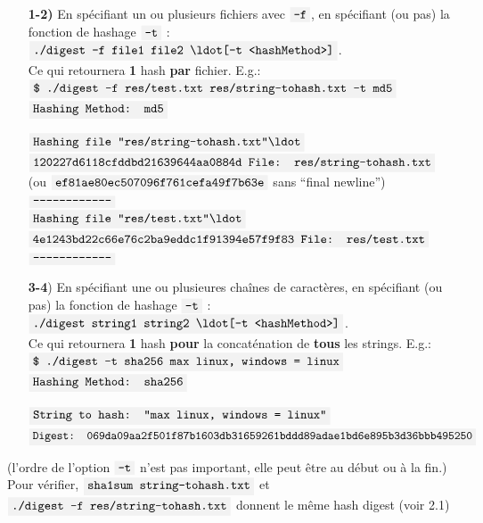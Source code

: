 \documentclass[draft, french]{article}
\newcommand{\code}[1]{$\mbox{\colorbox{light-gray}{\texttt{#1}}}$}
\newcommand{\quo}[1]{``{#1}''}
\begin{document}
\begin{enumerate}
    \item[\textbf{1-2)}] En spécifiant un ou plusieurs fichiers avec \code{-f}, en spécifiant (ou pas) la fonction de hashage \code{-t} :\\ 
    \code{./digest -f file1 file2 \ldot [-t <hashMethod>]}.\\
    
    Ce qui retournera \textbf{1} hash \textbf{par} fichier. E.g.:\\
    \code{\$ ./digest -f res/test.txt res/string-tohash.txt -t md5}\\
    
    \code{Hashing Method: md5}
    
    \code{Hashing file "res/string-tohash.txt"\ldot}\\
    \code{120227d6118cfddbd21639644aa0884d File: res/string-tohash.txt}\\ (ou \code{ef81ae80ec507096f761cefa49f7b63e} sans \quo{final newline})
    \code{------------------------}\\
    
    \code{Hashing file "res/test.txt"\ldot}\\
    \code{4e1243bd22c66e76c2ba9eddc1f91394e57f9f83 File: res/test.txt}\\
    \code{------------------------}\\
    
    \item[\textbf{3-4})] En spécifiant une ou plusieures chaînes de caractères, en spécifiant (ou pas) la fonction de hashage \code{-t} :\\
    \code{./digest string1 string2 \ldot [-t <hashMethod>]}.\\
    
     Ce qui retournera \textbf{1} hash \textbf{pour} la concaténation de \textbf{tous} les strings. E.g.:\\
    
    \code{\$ ./digest -t sha256 max linux, windows = linux}\\
    
    \code{Hashing Method: sha256}
    
    \code{String to hash: "max linux, windows = linux"}\\
    \code{Digest: 069da09aa2f501f87b1603db31659261bddd89adae1bd6e895b3d36bbb495250}\\
    
\end{enumerate}

(l'ordre de l'option \code{-t} n'est pas important, elle peut être au début ou à la fin.)\\

Pour vérifier, \code{sha1sum string-tohash.txt} et \code{./digest -f res/string-tohash.txt} donnent le même hash digest (voir 2.1)
\end{document}
